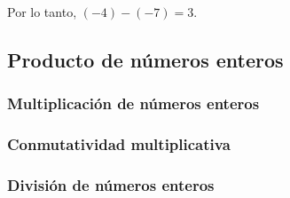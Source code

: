 Por lo tanto, $(-4) - (-7) = 3$.
\newpage

\subsection{Producto de n\'umeros enteros}

\subsubsection{Multiplicación de números enteros}

\subsubsection{Conmutatividad multiplicativa}

\subsubsection{División de números enteros}
